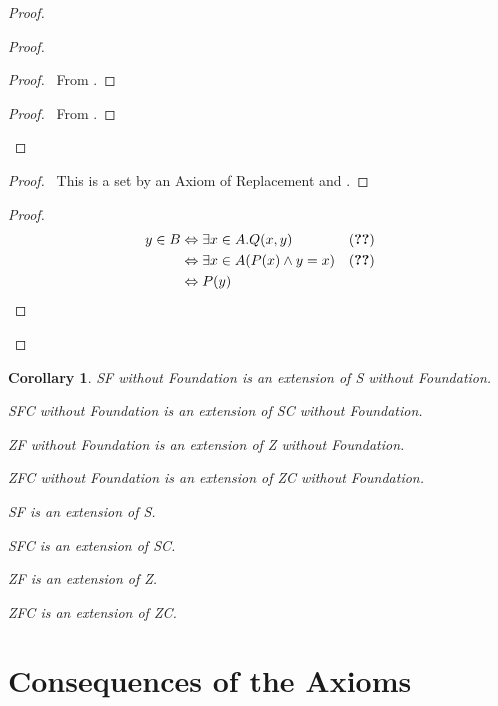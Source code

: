 \documentclass{book}
\let\qed\relax
\newtheorem{cor}{Corollary}[ax]
\theoremstyle{definition}
\begin{document}
\begin{proof}
\pf
{}
\begin{proof}
	\begin{proof}
		\pf\ From .
	\end{proof}
	\begin{proof}
		\pf\ From .
	\end{proof}
\end{proof}
\begin{proof}
	\pf\ This is a set by an Axiom of Replacement and .
\end{proof}
\begin{proof}
	\pf
	\begin{align*}
		y \in B & \Leftrightarrow \exists x \in A. Q(x,y) & (\text{\stepref{4}}) \\
		& \Leftrightarrow \exists x \in A (P(x) \wedge y = x) & (\text{\stepref{2}}) \\
		& \Leftrightarrow P(y)
	\end{align*}
\end{proof}
\qed
\end{proof}

\begin{cor}
SF without Foundation is an extension of S without Foundation.

SFC without Foundation is an extension of SC without Foundation.

ZF without Foundation is an extension of Z without Foundation.

ZFC without Foundation is an extension of ZC without Foundation.

SF is an extension of S.

SFC is an extension of SC.

ZF is an extension of Z.

ZFC is an extension of ZC.
\end{cor}

\section{Consequences of the Axioms}
\end{document}
